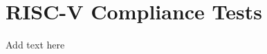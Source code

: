 \documentclass[../main.tex]{subfiles}
\begin{document}
\section{RISC-V Compliance Tests}
Add text here
\end{document}
